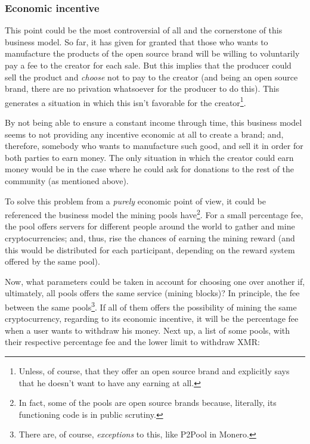\documentclass[12pt,a4paper]{article}
\begin{document}
\subsubsection{Economic incentive}
This point could be the most controversial of all and the cornerstone of this business model. So far, it has given for granted that those who wants to manufacture the products of the open source brand will be willing to voluntarily pay a fee to the creator for each sale. But this implies that the producer could sell the product and \textit{choose} not to pay to the creator (and being an open source brand, there are no privation whatsoever for the producer to do this). This generates a situation in which this isn't favorable for the creator\footnote{Unless, of course, that they offer an open source brand and explicitly says that he doesn't want to have any earning at all.}.

By not being able to ensure a constant income through time, this business model seems to not providing any incentive economic at all to create a brand; and, therefore, somebody who wants to manufacture such good, and sell it in order for both parties to earn money. The only situation in which the creator could earn money would be in the case where he could ask for donations to the rest of the community (as mentioned above).

To solve this problem from a \textit{purely} economic point of view, it could be referenced the business model the mining pools have\footnote{In fact, some of the pools are open source brands because, literally, its functioning code is in public scrutiny.}. For a small percentage fee, the pool offers servers for different people around the world to gather and mine cryptocurrencies; and, thus, rise the chances of earning the mining reward (and this would be distributed for each participant, depending on the reward system offered by the same pool).

Now, what parameters could be taken in account for choosing one over another if, ultimately, all pools offers the same service (mining blocks)? In principle, the fee between the same pools\footnote{There are, of course, \textit{exceptions} to this, like P2Pool in Monero.}. If all of them offers the possibility of mining the same cryptocurrency, regarding to its economic incentive, it will be the percentage fee when a user wants to withdraw his money. Next up, a list of some pools, with their respective percentage fee and the lower limit to withdraw XMR:
\end{document}
